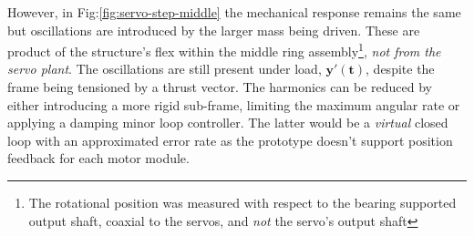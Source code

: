\par
However, in Fig:\ref{fig:servo-step-middle} the mechanical response remains the same but oscillations are introduced by the larger mass being driven. These are product of the structure's flex within the middle ring assembly\footnote{The rotational position was measured with respect to the bearing supported output shaft, coaxial to the servos, and \emph{not} the servo's output shaft}, \emph{not from the servo plant}. The oscillations are still present under load, {\color{Red}$\mathbf{y'(t)}$}, despite the frame being tensioned by a thrust vector. The harmonics can be reduced by either introducing a more rigid sub-frame, limiting the maximum angular rate or applying a damping minor loop controller. The latter would be a \emph{virtual} closed loop with an approximated error rate as the prototype doesn't support position feedback for each motor module.
\newpage
